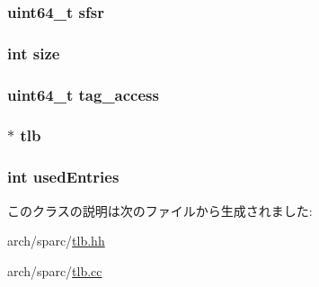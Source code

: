\label{classSparcISA_1_1TLB_a81cff85924ab4191c84c9818d90eb0a2}
\hypertarget{classSparcISA_1_1TLB_aa93fbd043dbccd30bf6f78f83bb088eb}{
\subsubsection[{sfsr}]{\setlength{\rightskip}{0pt plus 5cm}uint64\_\-t {\bf sfsr}}}
\label{classSparcISA_1_1TLB_aa93fbd043dbccd30bf6f78f83bb088eb}
\hypertarget{classSparcISA_1_1TLB_a439227feff9d7f55384e8780cfc2eb82}{
\subsubsection[{size}]{\setlength{\rightskip}{0pt plus 5cm}int {\bf size}}}
\label{classSparcISA_1_1TLB_a439227feff9d7f55384e8780cfc2eb82}
\hypertarget{classSparcISA_1_1TLB_a5d2c5251a072e8aef04cf78fdd6432d7}{
\subsubsection[{tag\_\-access}]{\setlength{\rightskip}{0pt plus 5cm}uint64\_\-t {\bf tag\_\-access}}}
\label{classSparcISA_1_1TLB_a5d2c5251a072e8aef04cf78fdd6432d7}
\hypertarget{classSparcISA_1_1TLB_a4651b9a4f432960d77d8e3d30175aab3}{
\subsubsection[{tlb}]{$\ast$ {\bf tlb}}}
\label{classSparcISA_1_1TLB_a4651b9a4f432960d77d8e3d30175aab3}
\hypertarget{classSparcISA_1_1TLB_ad85f3aef77516b13c75af59a1887f8b7}{
\subsubsection[{usedEntries}]{\setlength{\rightskip}{0pt plus 5cm}int {\bf usedEntries}}}
\label{classSparcISA_1_1TLB_ad85f3aef77516b13c75af59a1887f8b7}


このクラスの説明は次のファイルから生成されました:\begin{DoxyCompactItemize}
\item 
arch/sparc/\hyperlink{arch_2sparc_2tlb_8hh}{tlb.hh}\item 
arch/sparc/\hyperlink{arch_2sparc_2tlb_8cc}{tlb.cc}\end{DoxyCompactItemize}

